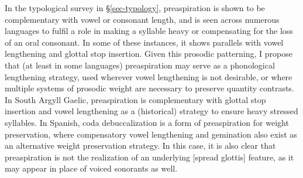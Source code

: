 \documentclass[output=paper,colorlinks,citecolor=brown]{langscibook}
\begin{document}
In the typological survey in \S\ref{sec-typology}, preaspiration is shown to be complementary with vowel or consonant length, and is seen across numerous languages to fulfil a role in making a syllable heavy or compensating for the loss of an oral consonant. In some of these instances, it shows parallels with vowel lengthening and glottal stop insertion. Given this prosodic patterning, I propose that (at least in some languages) preaspiration may serve as a phonological lengthening strategy, used wherever vowel lengthening is not desirable, or where multiple systems of prosodic weight are necessary to preserve quantity contrasts. In South Argyll Gaelic, preaspiration is complementary with glottal stop insertion and vowel lengthening as a (historical) strategy to ensure heavy stressed syllables. In Spanish, coda debuccalization is a form of preaspiration for weight preservation, where compensatory vowel lengthening and gemination also exist as an alternative weight preservation strategy. In this case, it is also clear that preaspiration is not the realization of an underlying [spread glottis] feature, as it may appear in place of voiced sonorants as well.  
\end{document}
